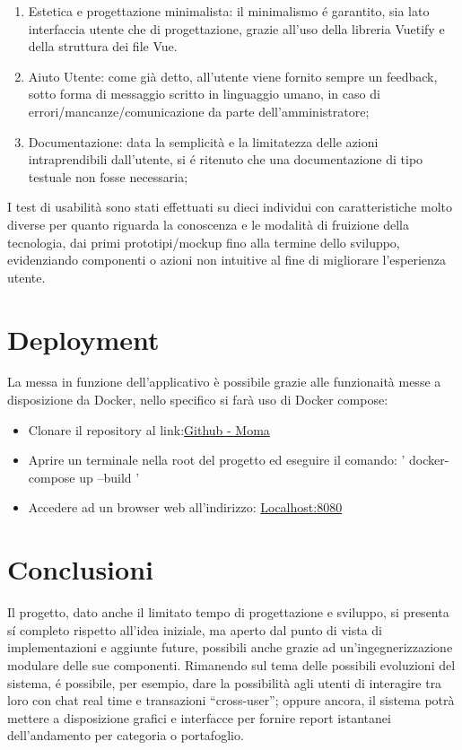 \documentclass{report}
\begin{document}
\begin{enumerate}
    \item Estetica e progettazione minimalista: il minimalismo é garantito, sia lato interfaccia utente che di progettazione, grazie all’uso della libreria Vuetify e della struttura dei file Vue.
    \item Aiuto Utente: come già detto, all’utente viene fornito sempre un feedback, sotto forma di messaggio scritto in linguaggio umano, in caso di errori/mancanze/comunicazione da parte dell’amministratore;
    \item Documentazione: data la semplicità e la limitatezza delle azioni intraprendibili dall’utente, si é ritenuto che una documentazione di tipo testuale non fosse necessaria;
\end{enumerate}
I test di usabilità sono stati effettuati su dieci individui con caratteristiche molto diverse per quanto riguarda la conoscenza e le modalità di fruizione della tecnologia, dai primi prototipi/mockup fino alla termine dello sviluppo, evidenziando componenti o azioni non intuitive al fine di migliorare l’esperienza utente.

\newpage

\section{Deployment}
La messa in funzione dell'applicativo è possibile grazie alle funzionaità messe a disposizione da Docker, nello specifico si farà uso di Docker compose:
\begin{itemize}
    \item Clonare il repository al link:\href{https://github.com/MicheleTorroni/MoMa}{Github - Moma}%
    \item Aprire un terminale nella root del progetto ed eseguire il comando: ' docker-compose up --build '
    \item Accedere ad un browser web all'indirizzo: \href{http://localhost:8080/}{Localhost:8080}
\end{itemize}
\newpage

\section{Conclusioni}
Il progetto, dato anche il limitato tempo di progettazione e sviluppo, si presenta sí completo rispetto all’idea iniziale, ma aperto dal punto di vista di implementazioni e aggiunte future, possibili anche grazie ad un’ingegnerizzazione modulare delle sue componenti.
\newline \newline
Rimanendo sul tema delle possibili evoluzioni del sistema, é possibile, per esempio, dare la possibilità agli utenti di interagire tra loro con chat real time e transazioni “cross-user”; oppure ancora, il sistema potrà mettere a disposizione grafici e interfacce per fornire report istantanei dell’andamento per categoria o portafoglio.
\end{document}
